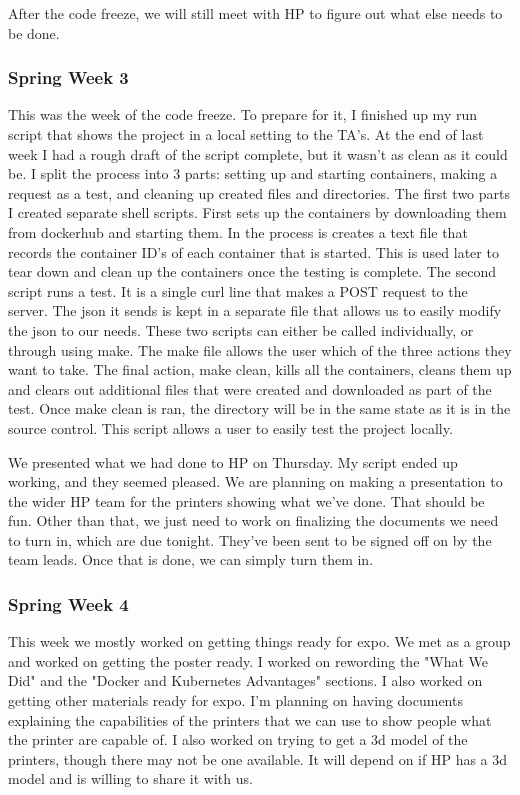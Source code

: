 \documentclass[onecolumn, draftclsnofoot,10pt, compsoc]{IEEEtran}
\begin{document}
After the code freeze, we will still meet with HP to figure out what else needs to be done.

\subsubsection*{Spring Week 3}
This was the week of the code freeze.  
To prepare for it, I finished up my run script that shows the project in a local setting to the TA's.  
At the end of last week I had a rough draft of the script complete, but it wasn't as clean as it could be.  
I split the process into 3 parts: setting up and starting containers, making a request as a test, and cleaning up created files and directories.  
The first two parts I created separate shell scripts.  
First sets up the containers by downloading them from dockerhub and starting them.  
In the process is creates a text file that records the container ID's of each container that is started.
This is used later to tear down and clean up the containers once the testing is complete.
The second script runs a test.
It is a single curl line that makes a POST request to the server.
The json it sends is kept in a separate file that allows us to easily modify the json to our needs.
These two scripts can either be called individually, or through using make.
The make file allows the user which of the three actions they want to take.
The final action, make clean, kills all the containers, cleans them up and clears out additional files that were created and downloaded as part of the test.
Once make clean is ran, the directory will be in the same state as it is in the source control.  
This script allows a user to easily test the project locally.

We presented what we had done to HP on Thursday.  My script ended up working, and they seemed pleased.  
We are planning on making a presentation to the wider HP team for the printers showing what we've done.  
That should be fun.
Other than that, we just need to work on finalizing the documents we need to turn in, which are due tonight.
They've been sent to be signed off on by the team leads.
Once that is done, we can simply turn them in.

\subsubsection*{Spring Week 4}
This week we mostly worked on getting things ready for expo.  We met as a group and worked on getting the poster ready.
I worked on rewording the "What We Did" and the "Docker and Kubernetes Advantages" sections.
I also worked on getting other materials ready for expo.  
I'm planning on having documents explaining the capabilities of the printers that we can use to show people what the printer are capable of.
I also worked on trying to get a 3d model of the printers, though there may not be one available.  
It will depend on if HP has a 3d model and is willing to share it with us.
\end{document}
